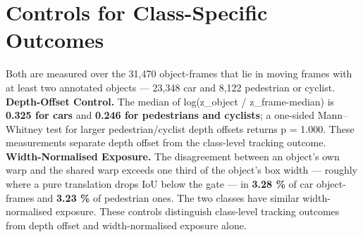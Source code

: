 \documentclass[sn-basic,Numbered]{sn-jnl}
\theoremstyle{thmstyleone}
\begin{document}
\section{Controls for Class-Specific Outcomes}\label{controls-for-class-specific-outcomes}

Both are measured over the 31,470 object-frames that lie in moving frames with at least two annotated objects --- 23,348 car and 8,122 pedestrian or cyclist. \textbf{Depth-Offset Control.} The median of \textbar log(z\_object / z\_frame-median)\textbar{} is \textbf{0.325 for cars} and \textbf{0.246 for pedestrians and cyclists}; a one-sided Mann--Whitney test for larger pedestrian/cyclist depth offsets returns p = 1.000. These measurements separate depth offset from the class-level tracking outcome. \textbf{Width-Normalised Exposure.} The disagreement between an object's own warp and the shared warp exceeds one third of the object's box width --- roughly where a pure translation drops IoU below the gate --- in \textbf{3.28 \%} of car object-frames and \textbf{3.23 \%} of pedestrian ones. The two classes have similar width-normalised exposure. These controls distinguish class-level tracking outcomes from depth offset and width-normalised exposure alone.
\end{document}
